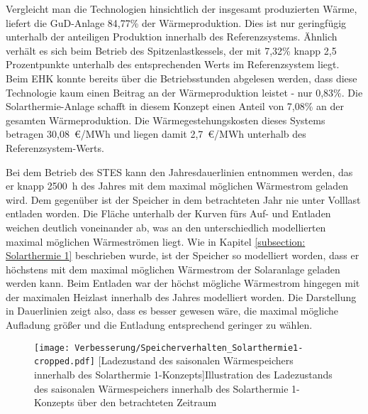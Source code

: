 Vergleicht man die Technologien hinsichtlich der insgesamt produzierten Wärme, liefert die \ac{GuD}-Anlage 84,77\% der Wärmeproduktion. Dies ist nur geringfügig unterhalb der anteiligen Produktion innerhalb des Referenzsystems. Ähnlich verhält es sich beim Betrieb des Spitzenlastkessels, der mit 7,32\% knapp 2,5 Prozentpunkte unterhalb des entsprechenden Werts im Referenzsystem liegt. Beim \ac{EHK} konnte bereits über die Betriebsstunden abgelesen werden, dass diese Technologie kaum einen Beitrag an der Wärmeproduktion leistet - nur 0,83\%. Die Solarthermie-Anlage schafft in diesem Konzept einen Anteil von 7,08\% an der gesamten Wärmeproduktion. Die Wärmegestehungskosten dieses Systems betragen 30,08~\euro/MWh und liegen damit 2,7~\euro/MWh unterhalb des Referenzsystem-Werts.

Bei dem Betrieb des \ac{STES} kann den Jahresdauerlinien entnommen werden, das er knapp 2500~h des Jahres mit dem maximal möglichen Wärmestrom geladen wird. Dem gegenüber ist der Speicher in dem betrachteten Jahr nie unter Volllast entladen worden. Die Fläche unterhalb der Kurven fürs Auf- und Entladen weichen deutlich voneinander ab, was an den unterschiedlich modellierten maximal möglichen Wärmeströmen liegt. Wie in Kapitel \ref{subsection: Solarthermie 1} beschrieben wurde, ist der Speicher so modelliert worden, dass er höchstens mit dem maximal möglichen Wärmestrom der Solaranlage geladen werden kann. Beim Entladen war der höchst mögliche Wärmestrom hingegen mit der maximalen Heizlast innerhalb des Jahres modelliert worden. Die Darstellung in Dauerlinien zeigt also, dass es besser gewesen wäre, die maximal mögliche Aufladung größer und die Entladung entsprechend geringer zu wählen.
	\begin{figure}
		\centering
		\texttt{[image: Verbesserung/Speicherverhalten\_Solarthermie1-cropped.pdf]}
		[Ladezustand des saisonalen Wärmespeichers innerhalb des Solarthermie 1-Konzepts]{Illustration des Ladezustands des saisonalen Wärmespeichers innerhalb des Solarthermie 1-Konzepts über den betrachteten Zeitraum}
		\label{figure: Speicherkapazität_Solarthermie1}
	\end{figure}

